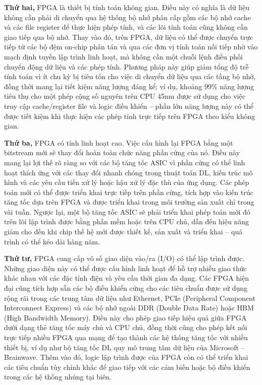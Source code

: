 \documentclass[a4paper]{article}
\begin{document}
\textbf{Thứ hai,} FPGA là thiết bị tính toán không gian. Điều này có nghĩa là dữ liệu không cần phải di chuyển qua hệ thống bộ nhớ phân cấp gồm các bộ nhớ cache và các file register để thực hiện phép tính, và các lõi tính toán cũng không cần giao tiếp qua bộ nhớ. Thay vào đó, trên FPGA, dữ liệu có thể được chuyển trực tiếp từ các bộ đệm on-chip phân tán và qua các đơn vị tính toán nối tiếp nhờ vào mạch định tuyến lập trình linh hoạt, mà không cần một chuỗi lệnh điều phối chuyển động dữ liệu và các phép tính. Phương pháp này giúp giảm tổng độ trễ tính toán vì ít chu kỳ bị tiêu tốn cho việc di chuyển dữ liệu qua các tầng bộ nhớ, đồng thời mang lại tiết kiệm năng lượng đáng kể; ví dụ, khoảng 99\% năng lượng tiêu thụ cho một phép cộng số nguyên trên CPU 45nm được sử dụng cho việc truy cập cache/register file và logic điều khiển – phần lớn năng lượng này có thể được tiết kiệm khi thực hiện các phép tính trực tiếp trên FPGA theo kiểu không gian.

\textbf{Thứ ba,} FPGA có tính linh hoạt cao. Việc cấu hình lại FPGA bằng một bitstream mới sẽ thay đổi hoàn toàn chức năng phần cứng của nó. Điều này mang lại lợi thế rõ ràng so với các bộ tăng tốc ASIC vì phần cứng có thể linh hoạt thích ứng với các thay đổi nhanh chóng trong thuật toán DL, kiến trúc mô hình và các yêu cầu tiền xử lý hoặc hậu xử lý đặc thù của ứng dụng. Các phép toán mới có thể được triển khai trực tiếp trên phần cứng, tích hợp vào kiến trúc tăng tốc dựa trên FPGA và được triển khai trong môi trường sản xuất chỉ trong vài tuần. Ngược lại, một bộ tăng tốc ASIC sẽ phải triển khai phép toán mới đó trên lõi lập trình được bằng phần mềm hoặc trên CPU chủ, dẫn đến hiệu năng giảm cho đến khi chip thế hệ mới được thiết kế, sản xuất và triển khai – quá trình có thể kéo dài hàng năm.

\textbf{Thứ tư,} FPGA cung cấp vô số giao diện vào/ra (I/O) có thể lập trình được. Những giao diện này có thể được cấu hình linh hoạt để hỗ trợ nhiều giao thức khác nhau với các đặc tính điện và yêu cầu thời gian đa dạng. Các FPGA hiện đại cũng tích hợp sẵn các bộ điều khiển cứng cho các tiêu chuẩn được sử dụng rộng rãi trong các trung tâm dữ liệu như Ethernet, PCIe (Peripheral Component Interconnect Express) và các bộ nhớ ngoài DDR (Double Data Rate) hoặc HBM (High Bandwidth Memory). Điều này cho phép giao tiếp hiệu quả giữa FPGA dưới dạng thẻ tăng tốc máy chủ và CPU chủ, đồng thời cũng cho phép kết nối trực tiếp nhiều FPGA qua mạng để tạo thành các hệ thống tăng tốc với nhiều thiết bị, ví dụ như bộ tăng tốc DL quy mô trung tâm dữ liệu của Microsoft – Brainwave. Thêm vào đó, logic lập trình được của FPGA còn có thể triển khai các tiêu chuẩn tùy chỉnh khác để giao tiếp với các cảm biến hoặc bộ điều khiển trong các hệ thống nhúng tại biên.
\end{document}
